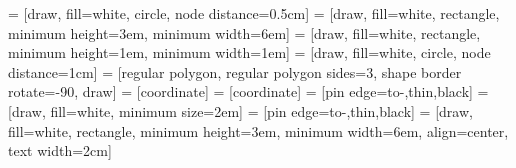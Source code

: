 \usepackage{graphicx}
\usepackage{amsmath,amsfonts,amssymb,amscd,verbatim,graphicx,fancyhdr,tikz}
\usepackage{mathtools} %

\usepackage{pgfplots}
\usetikzlibrary{arrows,automata}
\usetikzlibrary{positioning}
\usetikzlibrary{shapes.geometric}

\pgfplotsset{compat=1.15}

\usepackage{tikz} 
\usetikzlibrary{arrows.meta}
\usepackage{circuitikz}

\usepackage{esdiff}
\usepackage{siunitx}

\usepackage{palatino}
\usepackage{enumerate}
\usepackage{multicol}
\usepackage{listings}
\usepackage{color}
\usepackage{esdiff} %
\usepackage{hyperref}
\usepackage{cleveref}
\usepackage{bookmark}
\usepackage{tabularx}
\usepackage{booktabs}



\usepackage{accents}
\newcommand*{\dt}[1]{%
\accentset{\mbox{\large\bfseries .}}{#1}}
\newcommand*{\ddt}[1]{%
\accentset{\mbox{\large\bfseries .\hspace{-0.25ex}.}}{#1}}
\newcommand{\B}[1]{\mathbf{#1}}


\usepackage{caption}
\usepackage{subcaption}

\newcommand{\bs}[1]{\boldsymbol{#1}}
\newcommand{\underscore}{\char`\_}
\newcommand{\tildetext}{\char`\~}
\newcommand{\defn}{\stackrel{\triangle}{=}}
\newcommand{\deriv}[2]{\frac{d{#1}}{d{#2}}}
\newcommand{\cas}{\text{cas }}

\DeclareMathOperator*{\argmin}{argmin}
\DeclareMathOperator*{\argmax}{argmax}

\newcommand{\prob}[1]{\mathbb{P}\left[#1\right]}
\newcommand{\expect}[1]{\mathbb{E}\left[#1\right]}
\newcommand{\var}[1]{Var\left(#1\right)}
\newcommand{\cov}[1]{Cov\left(#1\right)}
\newcommand{\normal}[3]{#1\sim\mathcal{N}\left(#2, #3\right)}
\newcommand{\norm}[1]{\|#1\|}
\newcommand{\vecnorm}[1]{\|\vec{#1}\|}
\newcommand{\iid}{independently and identically distributed }
\renewcommand{\arraystretch}{1.5}

\DeclareSIUnit{}

 = [draw, fill=white, circle, node distance=0.5cm]
 = [draw, fill=white, rectangle, 
    minimum height=3em, minimum width=6em]
 = [draw, fill=white, rectangle, 
    minimum height=1em, minimum width=1em]
 = [draw, fill=white, circle, node distance=1cm]
 = [regular polygon, regular polygon sides=3, shape border rotate=-90, draw]
 = [coordinate]
 = [coordinate]
 = [pin edge={to-,thin,black}]
=[draw, fill=white, minimum size=2em]
 = [pin edge={to-,thin,black}]
 = [draw, fill=white, rectangle, minimum height=3em, minimum width=6em, align=center, text width=2cm]

